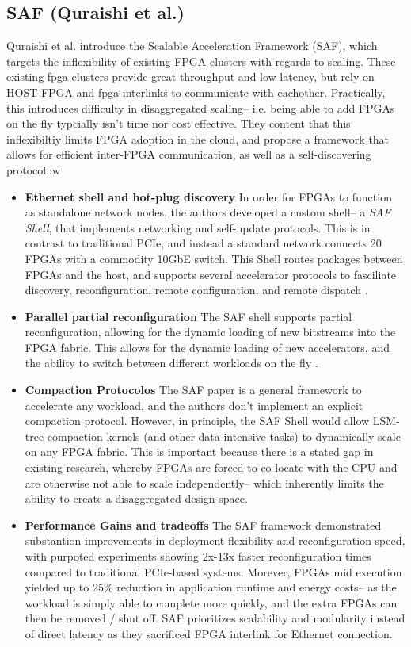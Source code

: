 \documentclass[sigconf]{acmart}
\begin{document}
  \subsection{SAF (Quraishi et al.)}
  Quraishi et al. introduce the Scalable Acceleration Framework (SAF), which targets the inflexibility of existing FPGA clusters with regards to scaling. These existing fpga clusters provide great throughput and low latency, but rely on 
  HOST-FPGA and fpga-interlinks to communicate with eachother. Practically, this introduces difficulty in disaggregated scaling-- i.e. being able to add FPGAs on the fly typcially isn't time nor cost effective. 
  They content that this inflexibiltiy limits FPGA adoption in the cloud, and propose a framework that allows for efficient inter-FPGA communication, as well as a self-discovering protocol.:w 
    \begin{itemize}
      \item \textbf{Ethernet shell and hot-plug discovery}
          In order for FPGAs to function as standalone network nodes, the authors developed a custom shell-- a \emph{SAF Shell}, that implements networking and self-update protocols. This is in contrast to traditional PCIe, and instead a standard network 
          connects 20 FPGAs with a commodity 10GbE switch. This Shell routes packages between FPGAs and the host, and supports several accelerator protocols to fasciliate discovery, reconfiguration, remote configuration, and remote dispatch \cite{quraishi2025saf}.
      \item \textbf{Parallel partial reconfiguration}
          The SAF shell supports partial reconfiguration, allowing for the dynamic loading of new bitstreams into the FPGA fabric. This allows for the dynamic loading of new accelerators, and the ability to switch between different workloads on the fly \cite{quraishi2025saf}.
      \item \textbf{Compaction Protocolos}
          The SAF paper is a general framework to accelerate any workload, and the authors don't implement an explicit compaction protocol. However, in principle, the SAF Shell would allow LSM-tree compaction kernels (and other data intensive tasks) to dynamically scale on any FPGA fabric. 
          This is important because there is a stated gap in existing research, whereby FPGAs are forced to co-locate with the CPU and are otherwise not able to scale independently-- which inherently limits the ability to create a disaggregated design space. 
      \item \textbf{Performance Gains and tradeoffs}
          The SAF framework demonstrated substantion improvements in deployment flexibility and reconfiguration speed, with purpoted experiments showing 2x-13x faster reconfiguration times compared to traditional PCIe-based systems.
          Morever, FPGAs mid execution yielded up to 25\% reduction in application runtime and energy costs-- as the workload is simply able to complete more quickly, and the extra FPGAs can then be removed / shut off. SAF prioritizes scalability and modularity instead of direct latency as they sacrificed FPGA interlink for Ethernet connection.
    \end{itemize}
\end{document}
